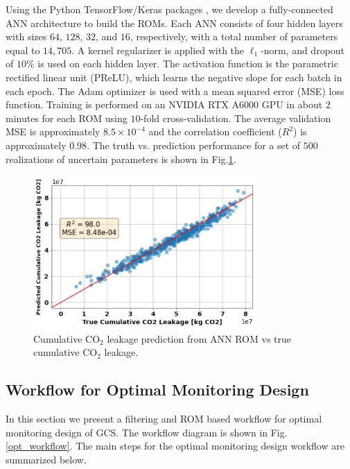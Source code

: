 \documentclass[a4paper,fleqn]{cas-sc}
\begin{document}
Using the Python TensorFlow/Keras packages \citep{tensorflow2015-whitepaper, chollet2015keras}, we develop a fully-connected ANN architecture to build the ROMs. Each ANN consists of four hidden layers with sizes $64$, $128$, $32$, and $16$, respectively, with a total number of parameters equal to $14,705$. A kernel regularizer is applied with the $\ell_1$-norm, and dropout of $10\%$ is used on each hidden layer. The activation function is the parametric rectified linear unit (PReLU), which learns the negative slope for each batch in each epoch. The Adam optimizer \citep{Kingma2014Adam} is used with a mean squared error (MSE) loss function. Training is performed on an NVIDIA RTX A$6000$ GPU in about $2$ minutes for each ROM using $10$-fold cross-validation. The average validation MSE is approximately $8.5\times10^{-4}$ and the correlation coefficient ($R^2$) is approximately $0.98$. The truth vs. prediction performance for a set of $500$ realizations of uncertain parameters is shown in Fig.\ref{rom_train}.

\begin{figure}
    \centering
    \includegraphics[width=8.5cm]{figs/Figure 3.pdf}
    \caption{Cumulative CO$_2$ leakage prediction from ANN ROM vs true cumulative CO$_2$ leakage.}
    \label{rom_train}
\end{figure}

\subsection{Workflow for Optimal Monitoring Design}
In this section we present a filtering and ROM based workflow for optimal monitoring design of GCS. The workflow diagram is shown in Fig. \ref{opt_workflow}. The main steps for the optimal monitoring design workflow are summarized below.
\end{document}
